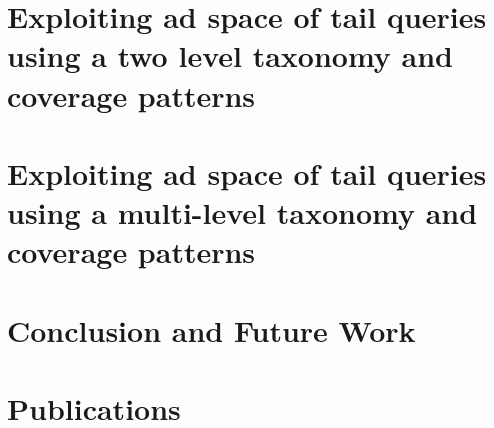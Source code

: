 \documentclass[11pt]{book}
\begin{document}
\chapter{Exploiting ad space of tail queries using a two level taxonomy and coverage patterns}
\label{ch:DSAA}



\chapter{Exploiting ad space of tail queries using a multi-level taxonomy and coverage patterns}
\label{ch:DASFAA}



\chapter{Conclusion and Future Work}


\chapter{Publications}
\label{ch:relatedPubs}




\nocite{*}


\end{document}
